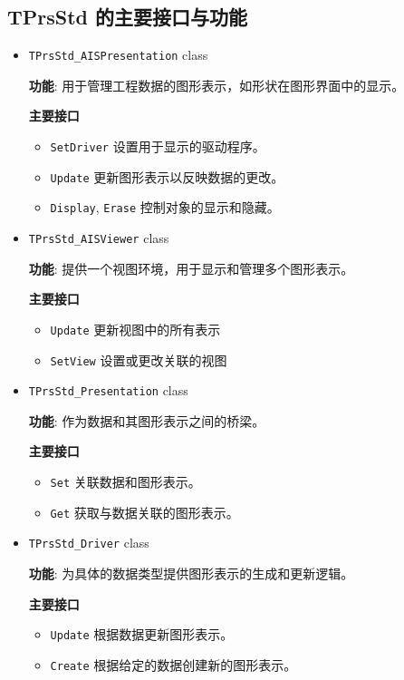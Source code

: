 \documentclass[11pt]{article}
\begin{document}
\subsection{TPrsStd 的主要接口与功能}
\label{sec:orgc664034}

\begin{itemize}
\item \texttt{TPrsStd\_AISPresentation} class

\textbf{功能}: 用于管理工程数据的图形表示，如形状在图形界面中的显示。

\textbf{主要接口}

\begin{itemize}
\item \texttt{SetDriver} 设置用于显示的驱动程序。
\item \texttt{Update} 更新图形表示以反映数据的更改。
\item \texttt{Display}, \texttt{Erase} 控制对象的显示和隐藏。
\end{itemize}

\item \texttt{TPrsStd\_AISViewer} class

\textbf{功能}: 提供一个视图环境，用于显示和管理多个图形表示。

\textbf{主要接口}

\begin{itemize}
\item \texttt{Update} 更新视图中的所有表示
\item \texttt{SetView} 设置或更改关联的视图
\end{itemize}

\item \texttt{TPrsStd\_Presentation} class

\textbf{功能}: 作为数据和其图形表示之间的桥梁。

\textbf{主要接口}

\begin{itemize}
\item \texttt{Set} 关联数据和图形表示。
\item \texttt{Get} 获取与数据关联的图形表示。
\end{itemize}

\item \texttt{TPrsStd\_Driver} class

\textbf{功能}: 为具体的数据类型提供图形表示的生成和更新逻辑。

\textbf{主要接口}

\begin{itemize}
\item \texttt{Update} 根据数据更新图形表示。
\item \texttt{Create} 根据给定的数据创建新的图形表示。
\end{itemize}
\end{itemize}
\end{document}
